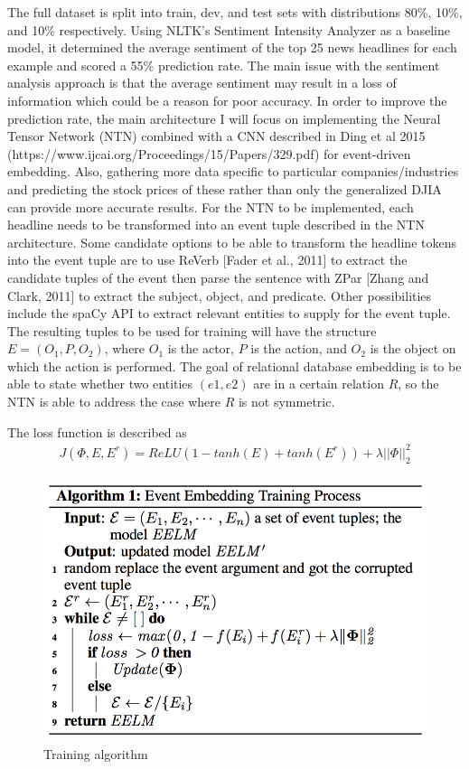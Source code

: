 \documentclass{article} %
\begin{document}
The full dataset is split into train, dev, and test sets with distributions 80\%, 10\%, and 10\% respectively.
Using NLTK's Sentiment Intensity Analyzer as a baseline model, it determined the average sentiment of the top 25 news headlines for each example and scored a 55\% prediction rate. 
The main issue with the sentiment analysis approach is that the average sentiment may result in a loss of information which could be a reason for poor accuracy.
In order to improve the prediction rate, the main architecture I will focus on implementing the Neural Tensor Network (NTN) combined with a CNN described in Ding et al 2015 (https://www.ijcai.org/Proceedings/15/Papers/329.pdf) for event-driven embedding.
Also, gathering more data specific to particular companies/industries and predicting the stock prices of these rather than only the generalized DJIA can provide more accurate results.
For the NTN to be implemented, each headline needs to be transformed into an event tuple described in the NTN architecture.
Some candidate options to be able to transform the headline tokens into the event tuple are to use ReVerb [Fader et al., 2011]
to extract the candidate tuples of the event then parse the sentence with ZPar [Zhang and Clark, 2011] to
extract the subject, object, and predicate.
Other possibilities include the spaCy API to extract relevant entities to supply for the event tuple.
The resulting tuples to be used for training will have the structure $E=(O_1, P, O_2)$, where $O_1$ is the actor,
$P$ is the action, and $O_2$ is the object on which the action is performed.
The goal of relational database embedding is to be able to state whether two entities $(e1, e2)$ are in a certain relation $R$,
so the NTN is able to address the case where $R$ is not symmetric.

The loss function is described as
\begin{align}
  J(\Phi, E, E^r) = ReLU(1 - tanh(E) + tanh(E^r)) + \lambda||\Phi||^2_2
\end{align}

\begin{figure}%
  \hspace*{-1cm}%
  \includegraphics[scale=0.5]{img/algo1}
  \caption{Training algorithm}
  \hspace*{-1cm}%
\end{figure}
\end{document}
